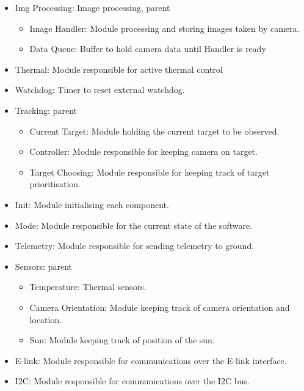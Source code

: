 \begin{itemize}

	\item Img Processing: Image processing, parent
		\begin{itemize}
			\item Image Handler: Module processing and storing images taken by camera.
			\item Data Queue: Buffer to hold camera data until Handler is ready
		\end{itemize}
		
	\item Thermal: Module responsible for active thermal control
	
	\item Watchdog: Timer to reset external watchdog.
	
	\item Tracking: parent
		\begin{itemize}
			\item Current Target: Module holding the current target to be observed.
			\item Controller: Module responsible for keeping camera on target.
			\item Target Choosing: Module responsible for keeping track of target prioritisation.
		\end{itemize}

	\item Init: Module initialising each component.
		
	\item Mode: Module responsible for the current state of the software.
	
	\item Telemetry: Module responsible for sending telemetry to ground.
	
	\item Sensors: parent
		\begin{itemize}
			\item Temperature: Thermal sensors.
			\item Camera Orientation: Module keeping track of camera orientation and location.
			\item Sun: Module keeping track of position of the sun.
		\end{itemize}
		
	\item E-link: Module responsible for communications over the E-link interface. 

	\item I2C: Module responsible for communications over the I2C bus.


\end{itemize}
